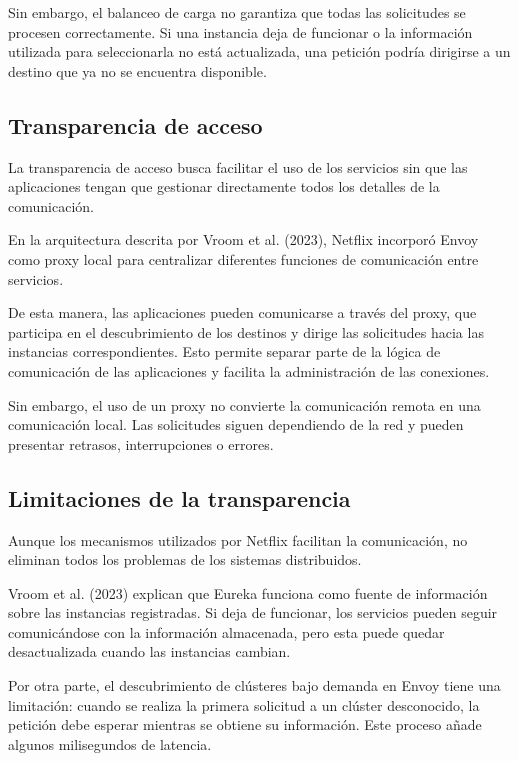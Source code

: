 Sin embargo, el balanceo de carga no garantiza que todas las solicitudes se procesen correctamente. Si una instancia deja de funcionar o la información utilizada para seleccionarla no está actualizada, una petición podría dirigirse a un destino que ya no se encuentra disponible.

\subsection{Transparencia de acceso}

La transparencia de acceso busca facilitar el uso de los servicios sin que las aplicaciones tengan que gestionar directamente todos los detalles de la comunicación.

En la arquitectura descrita por Vroom et al. (2023), Netflix incorporó Envoy como proxy local para centralizar diferentes funciones de comunicación entre servicios.

De esta manera, las aplicaciones pueden comunicarse a través del proxy, que participa en el descubrimiento de los destinos y dirige las solicitudes hacia las instancias correspondientes. Esto permite separar parte de la lógica de comunicación de las aplicaciones y facilita la administración de las conexiones.

Sin embargo, el uso de un proxy no convierte la comunicación remota en una comunicación local. Las solicitudes siguen dependiendo de la red y pueden presentar retrasos, interrupciones o errores.

\parencite{vroom2023mesh}


\subsection{Limitaciones de la transparencia}

Aunque los mecanismos utilizados por Netflix facilitan la comunicación, no eliminan todos los problemas de los sistemas distribuidos.

Vroom et al. (2023) explican que Eureka funciona como fuente de información sobre las instancias registradas. Si deja de funcionar, los servicios pueden seguir comunicándose con la información almacenada, pero esta puede quedar desactualizada cuando las instancias cambian.

Por otra parte, el descubrimiento de clústeres bajo demanda en Envoy tiene una limitación: cuando se realiza la primera solicitud a un clúster desconocido, la petición debe esperar mientras se obtiene su información. Este proceso añade algunos milisegundos de latencia.

